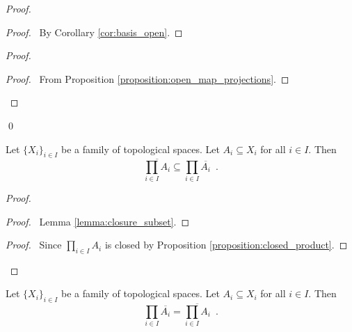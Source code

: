 \begin{proof}
    \pf
    \begin{proof}
        \pf\ By Corollary \ref{cor:basis_open}.
    \end{proof}
    \begin{proof}
        \begin{proof}
            \pf\ From Proposition \ref{proposition:open_map_projections}.
        \end{proof}
    \end{proof}
    \qed
\end{proof}

\begin{proposition}[Choice]
    \label{proposition:closure_in_product_topology_without_choice}
    Let $\{ X_i \}_{i \in I}$ be a family of topological spaces. Let $A_i \subseteq X_i$ for all $i \in I$.
    Then
    \[ \overline{\prod_{i \in I} A_i} \subseteq \prod_{i \in I} \overline{A_i} \enspace . \]
\end{proposition}

\begin{proof}
    \begin{proof}
        \pf\ Lemma \ref{lemma:closure_subset}.
    \end{proof}
    \qedstep
    \begin{proof}
        \pf\ Since $\prod_{i \in I} A_i$ is closed by Proposition \ref{proposition:closed_product}.
    \end{proof}
\end{proof}

\begin{proposition}[Choice]
    \label{proposition:closure_in_product_topology}
    Let $\{ X_i \}_{i \in I}$ be a family of topological spaces. Let $A_i \subseteq X_i$ for all $i \in I$.
    Then
    \[ \prod_{i \in I} \overline{A_i} = \overline{\prod_{i \in I} A_i} \enspace . \]
\end{proposition}

